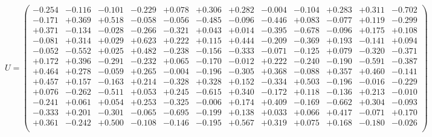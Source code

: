 \documentclass[9pt]{article}
\theoremstyle{plain}
\theoremstyle{definition}
\theoremstyle{remark}
\numberwithin{equation}{section}
\begin{document}
$U = \left(
\begin{array}{
cccccccccccc}
-0.254 & -0.116 & -0.101 & -0.229 & +0.078 & +0.306 & +0.282 & -0.004 & -0.104 & +0.283 & +0.311 & -0.702 \\
-0.171 & +0.369 & +0.518 & -0.058 & -0.056 & -0.485 & -0.096 & -0.446 & +0.083 & -0.077 & +0.119 & -0.299 \\
+0.371 & -0.134 & -0.028 & -0.266 & -0.321 & +0.043 & +0.014 & -0.395 & -0.678 & -0.096 & +0.175 & +0.108 \\
-0.081 & +0.314 & +0.029 & +0.623 & +0.222 & +0.115 & +0.444 & -0.209 & -0.369 & +0.193 & -0.141 & +0.094 \\
-0.052 & -0.552 & +0.025 & +0.482 & -0.238 & -0.156 & -0.333 & -0.071 & -0.125 & +0.079 & -0.320 & -0.371 \\
+0.172 & +0.396 & -0.291 & -0.232 & +0.065 & -0.170 & -0.012 & +0.222 & -0.240 & -0.190 & -0.591 & -0.387 \\
+0.464 & +0.278 & -0.059 & +0.265 & -0.004 & -0.196 & -0.305 & +0.368 & -0.088 & +0.357 & +0.460 & -0.141 \\
+0.457 & +0.157 & -0.163 & +0.214 & -0.328 & +0.328 & +0.152 & -0.334 & +0.503 & -0.196 & -0.016 & -0.229 \\
+0.076 & -0.262 & -0.511 & +0.053 & +0.245 & -0.615 & +0.340 & -0.172 & +0.118 & -0.136 & +0.213 & -0.010 \\
-0.241 & +0.061 & +0.054 & +0.253 & -0.325 & -0.006 & +0.174 & +0.409 & -0.169 & -0.662 & +0.304 & -0.093 \\
-0.333 & +0.201 & -0.301 & -0.065 & -0.695 & -0.199 & +0.138 & +0.033 & +0.066 & +0.417 & -0.071 & +0.170 \\
+0.361 & -0.242 & +0.500 & -0.108 & -0.146 & -0.195 & +0.567 & +0.319 & +0.075 & +0.168 & -0.180 & -0.026 \\
\end{array}
\right)$ \newline 
\end{document}
